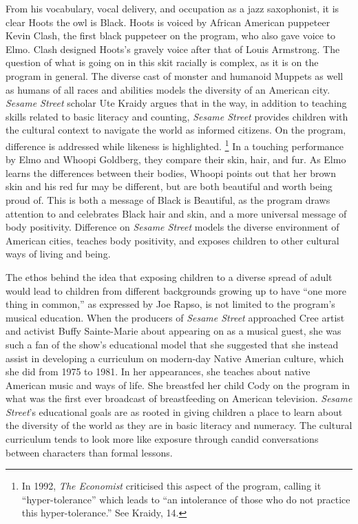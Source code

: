 \documentclass[12pt,letterpaper]{article}
\newcommand{\ses}{\textit{Sesame Street }}
\begin{document}
	From his vocabulary, vocal delivery, and occupation as a jazz 
	saxophonist, it is clear Hoots the owl is Black. Hoots is voiced by 
	African American puppeteer Kevin Clash, the first black puppeteer on the
	program, who also gave voice to Elmo. 
	Clash designed Hoots's gravely voice after that of Louis 
	Armstrong.\autocites()(Also see the biographical documentary of the same
	name.)[41]{Clash} The question of what is going on in this skit racially
	is complex, as it is on the program in general. The diverse cast of 
	monster and humanoid Muppets as well as humans of all races and 
	abilities models the diversity of an American city. \ses scholar Ute 
	Kraidy argues that in the way, in addition to teaching skills related
	to basic literacy and counting, \textit{Sesame Street} provides children
	with the cultural context to navigate the world as informed citizens.
	\autocite[13]{Kraidy} On the program, difference is addressed while
	likeness is highlighted\autocite[18]{Kraidy}. \footnote{In 
	1992, \textit{The Economist} criticised this aspect of the program, 
	calling it ``hyper-tolerance'' which leads to ``an intolerance of those
	who do not practice this hyper-tolerance.'' See Kraidy, 14.} In a
	touching performance by Elmo and Whoopi Goldberg, they
	compare their skin, hair, and fur. As Elmo learns the differences 
	between their bodies, Whoopi points out that her brown skin and his 
	red fur may be different, but are both beautiful and worth being proud 
	of.\autocite{2746} This is both a message of Black is Beautiful, as
	the program draws attention to and celebrates Black hair and skin, and 
	a more universal message of body positivity. Difference on \ses models
	the diverse environment of American cities, teaches body positivity, 
	and exposes children to other cultural ways of living and being.
	
	The ethos behind the idea that exposing children to a diverse spread 
	of adult would lead to children from different backgrounds growing up
	to have ``one more thing in common,'' as expressed by Joe Rapso, is not
	limited to the program's musical education. When the producers of 
	\ses approached Cree artist and activist Buffy Sainte-Marie about
	appearing on as a musical guest, she was such a fan of the show's 
	educational 
	model that she suggested that she instead assist in developing a 
	curriculum on modern-day Native Amerian culture, which she did from 
	1975 to 1981.\autocite[235]{Davis} In her appearances, she teaches 
	about native American music and ways of life. She breastfed her 
	child Cody on the program in what was the first ever broadcast of 
	breastfeeding on American television. \textit{Sesame Street}'s 
	educational goals are as rooted in giving children a place to learn
	about the diversity of the world as they are in basic literacy
	and numeracy. The cultural curriculum tends to look more like exposure
	through candid conversations between characters than formal
	lessons.  
\end{document}
